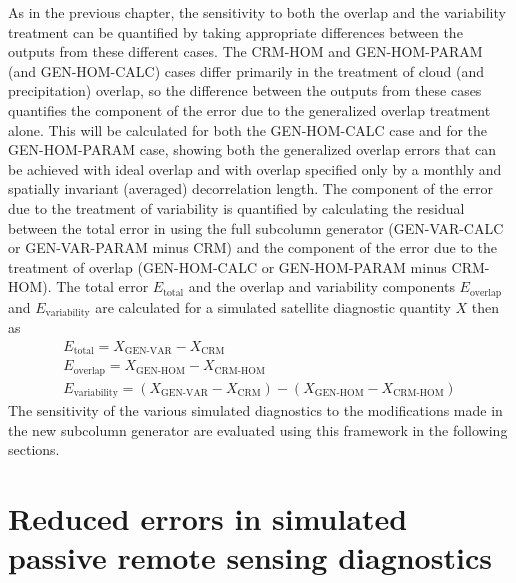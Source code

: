 As in the previous chapter, the sensitivity to both the overlap and the
variability treatment can be quantified by taking appropriate
differences between the outputs from these different cases. The CRM-HOM
and GEN-HOM-PARAM (and GEN-HOM-CALC) cases differ primarily in the
treatment of cloud (and precipitation) overlap, so the difference
between the outputs from these cases quantifies the component of the
error due to the generalized overlap treatment alone. This will be
calculated for both the GEN-HOM-CALC case and for the GEN-HOM-PARAM
case, showing both the generalized overlap errors that can be achieved
with ideal overlap and with overlap specified only by a monthly and
spatially invariant (averaged) decorrelation length. The component of
the error due to the treatment of variability is quantified by
calculating the residual between the total error in using the full
subcolumn generator (GEN-VAR-CALC or GEN-VAR-PARAM minus CRM) and the
component of the error due to the treatment of overlap (GEN-HOM-CALC or
GEN-HOM-PARAM minus CRM-HOM). The total error \(E_\textrm{total}\) and
the overlap and variability components \(E_\textrm{overlap}\) and
\(E_\textrm{variability}\) are calculated for a simulated satellite
diagnostic quantity \(X\) then as \[\begin{gathered}
E_\textrm{total} = X_\textrm{GEN-VAR} - X_\textrm{CRM} \\
E_\textrm{overlap} = X_\textrm{GEN-HOM} - X_\textrm{CRM-HOM} \\
E_\textrm{variability} = (X_\textrm{GEN-VAR} - X_\textrm{CRM}) - (X_\textrm{GEN-HOM} - X_\textrm{CRM-HOM})\end{gathered}\]
The sensitivity of the various simulated diagnostics to the
modifications made in the new subcolumn generator are evaluated using
this framework in the following sections.

\section{Reduced errors in simulated passive remote sensing
diagnostics}\label{sec:subgrid2ux5fpassiveux5fresults}

